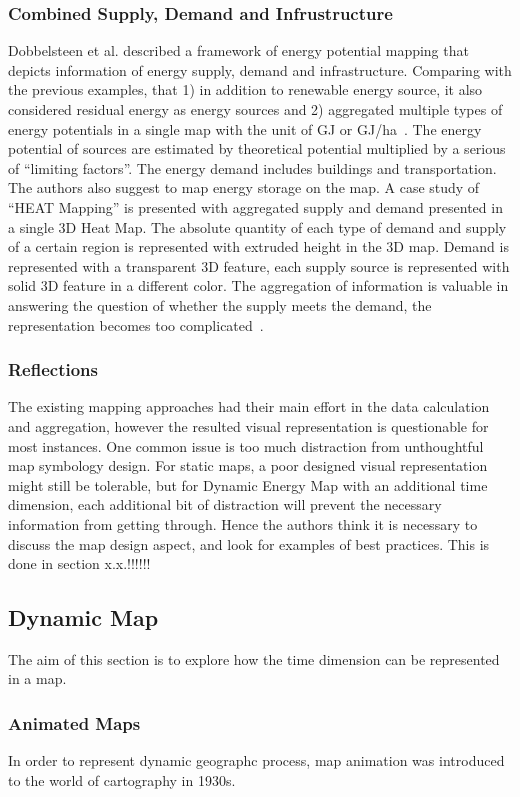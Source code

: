 \documentclass[hidelinks,12pt]{article}
\begin{document}
\subsubsection{Combined Supply, Demand and Infrustructure}
Dobbelsteen et al. described a framework of energy potential mapping
that depicts information of energy supply, demand and infrastructure.
Comparing with the previous examples, that 1) in addition to renewable
energy source, it also considered residual energy as energy sources
and 2) aggregated multiple types of energy potentials in a single map
with the unit of GJ or GJ/ha~\cite{Dobbelsteen2013}. The energy
potential of sources are estimated by theoretical potential multiplied
by a serious of ``limiting factors''. The energy demand includes
buildings and transportation. The authors also suggest to map energy
storage on the map. A case study of ``HEAT Mapping'' is presented with
aggregated supply and demand presented in a single 3D Heat Map. The
absolute quantity of each type of demand and supply of a certain
region is represented with extruded height in the 3D map. Demand is
represented with a transparent 3D feature, each supply source is
represented with solid 3D feature in a different color. The
aggregation of information is valuable in answering the question of
whether the supply meets the demand, the representation becomes too
complicated~\cite{Dobbelsteen2013}.

\subsubsection{Reflections}
The existing mapping approaches had their main effort in the data
calculation and aggregation, however the resulted visual
representation is questionable for most instances. One common issue is
too much distraction from unthoughtful map symbology design. For
static maps, a poor designed visual representation might still be
tolerable, but for Dynamic Energy Map with an additional time
dimension, each additional bit of distraction will prevent the
necessary information from getting through. Hence the authors think it
is necessary to discuss the map design aspect, and look for examples
of best practices. This is done in section x.x.!!!!!!

\subsection{Dynamic Map}
The aim of this section is to explore how the time dimension can be
represented in a map.
\subsubsection{Animated Maps}
In order to represent dynamic geographc process, map animation was
introduced to the world of cartography in 1930s. ~\cite{Harrower2008}
\end{document}
